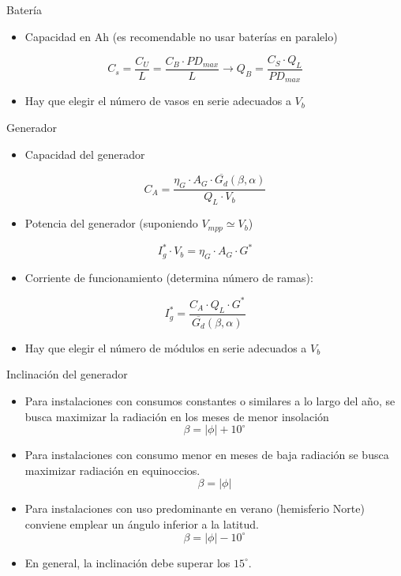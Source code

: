 \documentclass[xcolor={usenames,svgnames,dvipsnames}]{beamer}
\begin{document}
\begin{frame}[label={sec:org037c78a}]{Batería}
\begin{itemize}
\item Capacidad en Ah (es recomendable no usar baterías en paralelo)
\end{itemize}
\[
C_{s}=\frac{C_{U}}{L}=\frac{C_{B}\cdot PD_{max}}{L} \rightarrow \boxed{Q_B = \frac{C_S \cdot Q_L}{PD_{max}}}
\]

\begin{itemize}
\item Hay que elegir el número de vasos en serie adecuados a \(V_b\)
\end{itemize}
\end{frame}


\begin{frame}[label={sec:org5d8281f}]{Generador}
\begin{itemize}
\item Capacidad del generador
\end{itemize}
\[
C_{A} = \frac{\eta_{G}\cdot A_{G}\cdot\overline{G_{d}}(\beta,\alpha)}{Q_L \cdot V_b}
\]

\begin{itemize}
\item Potencia del generador (suponiendo \(V_{mpp} \simeq V_{b}\))
\end{itemize}
\[
I_{g}^{*}\cdot V_{b} = \eta_{G}\cdot A_{G}\cdot G^*
\]

\begin{itemize}
\item Corriente de funcionamiento (determina número de ramas):
\end{itemize}
\[
\boxed{I_{g}^{*} =  \frac{C_{A}\cdot Q_{L}\cdot G^*}{\overline{G_{d}}(\beta,\alpha)}}
\]

\begin{itemize}
\item Hay que elegir el número de módulos en serie adecuados a \(V_b\)
\end{itemize}
\end{frame}

\begin{frame}[label={sec:org01281ad}]{Inclinación del generador}
\begin{itemize}
\item Para instalaciones con \alert{consumos constantes o similares a lo largo del año}, se busca maximizar la radiación en los meses de menor insolación $$\beta=|\phi|+10^{\circ}$$

\item Para instalaciones con \alert{consumo menor en meses de baja radiación} se busca maximizar radiación en equinoccios.$$\beta=|\phi|$$

\item Para instalaciones con \alert{uso predominante en verano} (hemisferio Norte) conviene emplear un ángulo inferior a la latitud. $$\beta=|\phi|-10^{\circ}$$

\item En general, la inclinación \alert{debe superar} los \(15^{\circ}\).
\end{itemize}
\end{frame}
\end{document}
